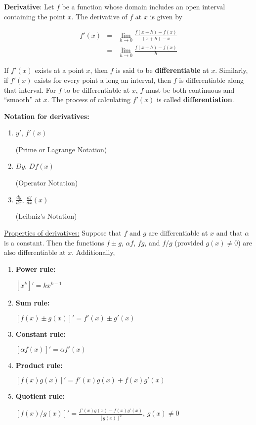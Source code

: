 \documentclass[]{book}
\theoremstyle{definition}
\theoremstyle{definition}
\theoremstyle{definition}
\theoremstyle{remark}
\begin{document}
\textbf{Derivative}: Let \(f\) be a function whose domain includes an
open interval containing the point \(x\). The derivative of \(f\) at
\(x\) is given by

\begin{eqnarray}
        f'(x) &=&\lim\limits_{h\to 0} \frac{f(x+h)-f(x)}{(x+h)-x}\nonumber\\
        &=&\lim\limits_{h\to 0} \frac{f(x+h)-f(x)}{h}\nonumber
\end{eqnarray}

If \(f'(x)\) exists at a point \(x\), then \(f\) is said to be
\textbf{differentiable} at \(x\). Similarly, if \(f'(x)\) exists for
every point a long an interval, then \(f\) is differentiable along that
interval. For \(f\) to be differentiable at \(x\), \(f\) must be both
continuous and ``smooth'' at \(x\). The process of calculating \(f'(x)\)
is called \textbf{differentiation}.

\textbf{Notation for derivatives:}

\begin{enumerate}
        \item \parbox[t]{2in}{$y'$, $f'(x)$} (Prime or Lagrange Notation)
        \item \parbox[t]{2in}{$Dy$, $Df(x)$} (Operator Notation)
        \item \parbox[t]{2in}{$\frac{dy}{dx}$, $\frac{df}{dx}(x)$} (Leibniz's Notation)
\end{enumerate}

\underline{Properties of derivatives:} Suppose that \(f\) and \(g\) are
differentiable at \(x\) and that \(\alpha\) is a constant. Then the
functions \(f\pm g\), \(\alpha f\), \(f g\), and \(f/g\) (provided
\(g(x)\ne 0\)) are also differentiable at \(x\). Additionally,

\begin{enumerate}
        \item \parbox[t]{2in}{\bf Power rule:} $[x^k]' = k x^{k-1}$  
        \item \parbox[t]{2in}{\bf Sum rule:} $[f(x)\pm g(x)]' = f'(x)\pm g'(x)$ 
        \item \parbox[t]{2in}{\bf Constant rule:} $[\alpha f(x)]' = \alpha f'(x)$ 
        \item \parbox[t]{2in}{\bf Product rule:} $[f(x)g(x)]' = f'(x)g(x)+f(x)g'(x)$
        \item \parbox[t]{2in}{\bf Quotient rule:} $[f(x)/g(x)]' = \frac{f'(x)g(x)-f(x)g'(x)}{[g(x)]^2}$, $g(x)\ne 0$\\
\end{enumerate}
\end{document}
